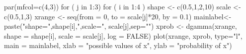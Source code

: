 \begin{Schunk}
\begin{Sinput}
 par(mfcol=c(4,3))
 for ( j in 1:3){
   for ( i in 1:4 ){
    shape <- c(0.5,1,2,10)
    scale <- c(0.5,1,3)
    xrange <- seq(from = 0, to = scale[j]*20, by = 0.1)
    mainlabel<- paste("shape=",shape[i],",scale=", scale[j],sep="")
    xprob <- dgamma(xrange, shape = shape[i], scale = scale[j], log = FALSE)
    plot(xrange, xprob, type="l", main = mainlabel, xlab = "possible values of x", ylab = "probability of x")
   }
  }
\end{Sinput}
\end{Schunk}
